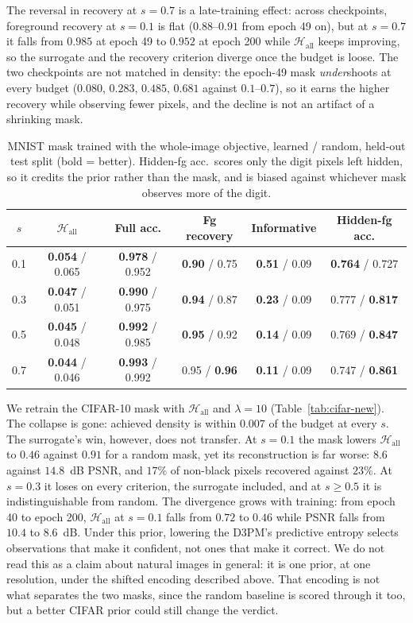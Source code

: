 \documentclass{article}
\begin{document}
The reversal in recovery at $s = 0.7$ is a late-training effect: across checkpoints, foreground recovery at $s = 0.1$ is flat ($0.88$--$0.91$ from epoch 49 on), but at $s = 0.7$ it falls from $0.985$ at epoch 49 to $0.952$ at epoch 200 while $\mathcal{H}_{\mathrm{all}}$ keeps improving, so the surrogate and the recovery criterion diverge once the budget is loose. The two checkpoints are not matched in density: the epoch-49 mask \emph{under}shoots at every budget ($0.080$, $0.283$, $0.485$, $0.681$ against $0.1$--$0.7$), so it earns the higher recovery while observing fewer pixels, and the decline is not an artifact of a shrinking mask.

\begin{table}[t]
\centering
\caption{MNIST mask trained with the whole-image objective, learned / random, held-out test split (bold = better). Hidden-fg acc.\ scores only the digit pixels left hidden, so it credits the prior rather than the mask, and is biased against whichever mask observes more of the digit.}
\label{tab:mnist-new}
\small
\setlength{\tabcolsep}{3.5pt}
\begin{tabular}{cccccc}
\hline
$s$ & $\mathcal{H}_{\mathrm{all}}$ & Full acc. & Fg recovery & Informative & Hidden-fg acc. \\
\hline
0.1 & \textbf{0.054} / 0.065 & \textbf{0.978} / 0.952 & \textbf{0.90} / 0.75 & \textbf{0.51} / 0.09 & \textbf{0.764} / 0.727 \\
0.3 & \textbf{0.047} / 0.051 & \textbf{0.990} / 0.975 & \textbf{0.94} / 0.87 & \textbf{0.23} / 0.09 & 0.777 / \textbf{0.817} \\
0.5 & \textbf{0.045} / 0.048 & \textbf{0.992} / 0.985 & \textbf{0.95} / 0.92 & \textbf{0.14} / 0.09 & 0.769 / \textbf{0.847} \\
0.7 & \textbf{0.044} / 0.046 & \textbf{0.993} / 0.992 & 0.95 / \textbf{0.96} & \textbf{0.11} / 0.09 & 0.747 / \textbf{0.861} \\
\hline
\end{tabular}
\end{table}

We retrain the CIFAR-10 mask with $\mathcal{H}_{\mathrm{all}}$ and $\lambda = 10$ (Table~\ref{tab:cifar-new}). The collapse is gone: achieved density is within $0.007$ of the budget at every $s$. The surrogate's win, however, does not transfer. At $s = 0.1$ the mask lowers $\mathcal{H}_{\mathrm{all}}$ to $0.46$ against $0.91$ for a random mask, yet its reconstruction is far worse: $8.6$ against $14.8$~dB PSNR, and $17\%$ of non-black pixels recovered against $23\%$. At $s = 0.3$ it loses on every criterion, the surrogate included, and at $s \ge 0.5$ it is indistinguishable from random. The divergence grows with training: from epoch 40 to epoch 200, $\mathcal{H}_{\mathrm{all}}$ at $s = 0.1$ falls from $0.72$ to $0.46$ while PSNR falls from $10.4$ to $8.6$~dB. Under this prior, lowering the D3PM's predictive entropy selects observations that make it confident, not ones that make it correct. We do not read this as a claim about natural images in general: it is one prior, at one resolution, under the shifted encoding described above. That encoding is not what separates the two masks, since the random baseline is scored through it too, but a better CIFAR prior could still change the verdict.
\end{document}
